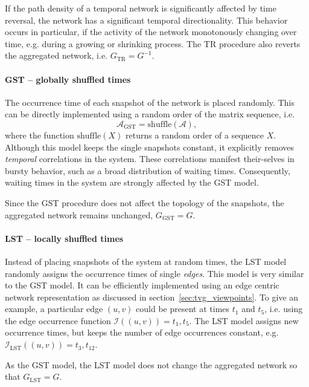 If the path density of a temporal network is significantly affected by time reversal, the network has a significant temporal directionality.
This behavior occurs in particular, if the activity of the network monotonously changing over time, e.g. during a growing or shrinking process.
The TR procedure also reverts the aggregated network, i.e. $G_{\mathrm{TR}}=G^{-1}$.

\paragraph{GST -- globally shuffled times\color{Cayenne}{.}}
The occurrence time of each snapshot of the network is placed randomly.
This can be directly implemented using a random order of the matrix sequence, i.e.
\begin{equation}\label{eq:GST_sequence}
\mathcal{A}_\mathrm{GST}=\mathrm{shuffle}(\mathcal{A}) ,
\end{equation}
where the function $\mathrm{shuffle}(X)$ returns a random order of a sequence $X$.
Although this model keeps the single snapshots constant, it explicitly removes \emph{temporal} correlations in the system.
These correlations manifest their-selves in bursty behavior, such as a broad distribution of waiting times.
Consequently, waiting times in the system are strongly affected by the GST model.

Since the GST procedure does not affect the topology of the snapshots, the aggregated network remains unchanged, $G_\mathrm{GST}=G$.

\paragraph{LST -- locally shuffled times\color{Cayenne}{.}}
Instead of placing snapshots of the system at random times, the LST model randomly assigns the occurrence times of single \emph{edges}.
This model is very similar to the GST model.
It can be efficiently implemented using an edge centric network representation as discussed in section~\ref{sec:tvg_viewpoints}.
To give an example, a particular edge $(u,v)$ could be present at times $t_1$ and $t_5$, i.e. using the edge occurrence function $\mathcal{I}((u,v))=t_1,t_5$.
The LST model assigns new occurrence times, but keeps the number of edge occurrences constant, e.g. $\mathcal{I}_\mathrm{LST} ((u,v))=t_3,t_{12}$.

As the GST model, the LST model does not change the aggregated network so that $G_\mathrm{LST}=G$.

